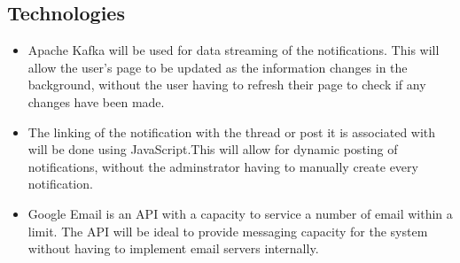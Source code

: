 \documentclass[12pt]{article}
\begin{document}
\subsection{Technologies}
\begin{itemize}
\item Apache Kafka will be used for data streaming of the notifications. This will allow the user's page to be updated as the information changes in the background, without the user having to refresh their page to check if any changes have been made.
\item The linking of the notification with the thread or post it is associated with will be done using JavaScript.This will allow for dynamic posting of notifications, without the adminstrator having to manually create every notification.
\item Google Email is an API with a capacity to service a number of email within a limit. The API will be ideal to provide messaging capacity for the system without having to implement email servers internally.
\end{itemize}
\end{document}
